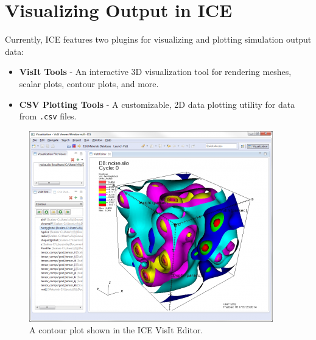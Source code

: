 \chapter{Visualizing Output in ICE}
\label{sec:visOutput}
Currently, ICE features two plugins for visualizing and plotting
simulation output data:

\begin{itemize}
\itemsep1pt\parskip0pt
\item
  \textbf{VisIt Tools} - An interactive 3D visualization tool for
  rendering meshes, scalar plots, contour plots, and more.
\end{itemize}

\begin{itemize}
\itemsep1pt\parskip0pt
\item
  \textbf{CSV Plotting Tools} - A customizable, 2D data plotting utility
  for data from \texttt{.csv} files.
\end{itemize}


\begin{figure}[htbp]
\centering
\includegraphics[width=\textwidth]{figures/ICE_VisIt.png}
\caption{A contour plot shown in the ICE VisIt Editor. }
\end{figure}

